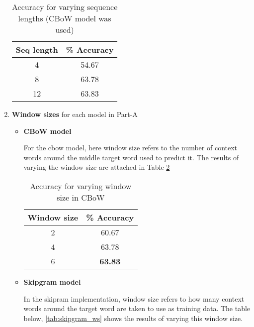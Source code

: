 \documentclass{article}
\begin{document}
\begin{enumerate}
    \begin{table}[h!]
    \begin{center}
    \begin{tabular}{ |c|c|} 
     \hline
    Seq length  & \% Accuracy \\ 
     \hline \hline
    4 &   54.67\\
     \hline
    8 &   63.78\\ 
    \hline
    12  & 63.83\\
    \hline
    \hline
    \end{tabular}
    \caption{Accuracy for varying sequence lengths (CBoW model was used) }
    \label{tab:seq_len_res}
    \end{center}
    \end{table}
    
    \newpage
    \item \textbf{Window sizes} for each model in Part-A 
        \begin{itemize}
            \item \textbf{CBoW model} 
            
            For the cbow model, here window size refers to the number of context words around the middle target word used to predict it. The results of varying the window size are attached in Table \ref{tab:cbow_ws}
                \begin{table}[h!]
                \begin{center}
                \begin{tabular}{ |c|c|} 
                 \hline
                Window size  & \% Accuracy \\ 
                 \hline \hline
                2 &   60.67\\
                 \hline
                4 &   63.78\\ 
                \hline
                6  &\textbf{ 63.83}\\
                \hline
                \hline
                \end{tabular}
                \caption{Accuracy for varying window size in CBoW }
                \label{tab:cbow_ws}
                \end{center}
                \end{table}
            \item \textbf{Skipgram model}

            
            In the skipram implementation, window size refers to how many context words around the target word are taken to use as training data. The table below, \ref{tab:skipgram_ws} shows the results of varying this window size.


\end{itemize}
\end{enumerate}
\end{document}

